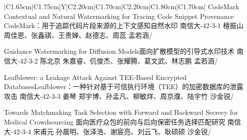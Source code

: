 \Needspace{7.5cm}
\begin{tabularx}{\textwidth}{|C{1.65cm}|C{1.75cm}|Y|C{2.20cm}|C{1.70cm}|C{2.20cm}|C{1.80cm}|C{1.70cm}|}
\HeaderRow
{}
{CodeMark Contextual and Natural Watermarking for Tracing Code Snippet Provenance \newline CodeMark：用于追踪代码片段来源的上下文感知自然水印}
{南信大-42-3-1}
{檀振山}
{周佳恩、张鑫祺、王贵婵、赵德志、周蕊}
{孟若涵}{/}

{Guidance Watermarking for Diffusion Models\newline 面向扩散模型的引导式水印技术 }
{南信大-42-3-2}
{陈北京}
{朱嘉睿、仉俊杰、张耀腾、葛文武、林志鹏}
{孟若涵}{/}


{Leafblower: a Leakage Attack Against TEE-Based Encrypted Databases\newline Leafblower：一种针对基于可信执行环境（TEE）的加密数据库的泄露攻击}
{南信大-42-3-3}
{姜琴}
{郑宇博、孙孟凡、柳敏烊、周京濮、陆宇竹}
{沙金锐}{/}

{Towards Matchmaking Task Selection with Forward and Backward Secrecy for Medical Crowdsourcing  \newline 面向医疗众包的前向与后向保密任务选择匹配研究}
{南信大-42-3-4}
{宋甫元}
{孙晨明、张泽浩、谢宸亮、刘云飞、耿硕硕}
{沙金锐}{/}
\end{tabularx}
\BlockGap






